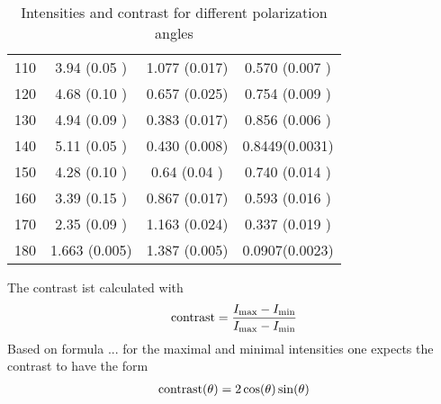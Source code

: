 \begin{table}[H]
\begin{tabular}{S[table-format=3.0] S S S[table-format=1.4(2)]}
		110                             & 3.94  (0.05 )              & 1.077 (0.017)              & 0.570 (0.007 ) \\
		120                             & 4.68  (0.10 )              & 0.657 (0.025)              & 0.754 (0.009 ) \\
		130                             & 4.94  (0.09 )              & 0.383 (0.017)              & 0.856 (0.006 ) \\
		140                             & 5.11  (0.05 )              & 0.430 (0.008)              & 0.8449(0.0031) \\
		150                             & 4.28  (0.10 )              & 0.64  (0.04 )              & 0.740 (0.014 ) \\
		160                             & 3.39  (0.15 )              & 0.867 (0.017)              & 0.593 (0.016 ) \\
		170                             & 2.35  (0.09 )              & 1.163 (0.024)              & 0.337 (0.019 ) \\
		180                             & 1.663 (0.005)              & 1.387 (0.005)              & 0.0907(0.0023) \\
		\bottomrule
	\end{tabular}
	\caption{Intensities and contrast for different polarization angles}\label{tab:contrast}
\end{table}

The contrast ist calculated with
\begin{align}
	\text{contrast} = \frac{I_\text{max} -I_\text{min}}{I_\text{max}-I_\text{min}}
\end{align}
Based on formula ... for the maximal and minimal intensities one expects the
contrast to have the form
\begin{align}
	\text{contrast}(\theta) = 2\cos(\theta)\sin(\theta)
\end{align}

